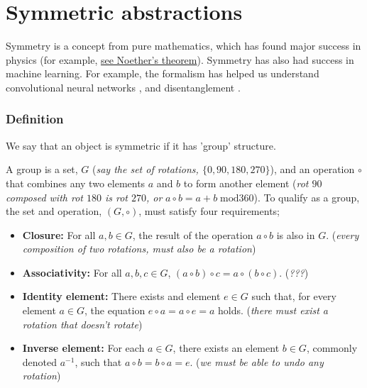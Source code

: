 \newpage
\section{Symmetric abstractions}\label{symmetric-abstractions}

Symmetry is a concept from pure mathematics, which has found major success in physics (for example, \href{https://en.wikipedia.org/wiki/Noether%27s_theorem}{see Noether's theorem}).
Symmetry has also had success in machine learning. For example, the formalism has
helped us understand convolutional neural networks \cite{Cohen2017}, and disentanglement \cite{Higgins2018}.




\subsubsection{Definition}

We say that an object is symmetric if it has 'group' structure.

A group is a set, $G$ (\textit{say the set of rotations, $\{0, 90, 180, 270\}$}),
and an operation $\circ$ that combines any two elements $a$ and $b$ to form
another element (\textit{rot $90$ composed with rot $180$ is rot $270$, or} $a \circ b = a + b \;\text{mod} 360$).
To qualify as a group, the set and operation, $(G, \circ)$, must satisfy four requirements;

\begin{itemize}
	\tightlist
	\item \textbf{Closure:} For all $a, b \in G$, the result of the operation $a \circ b$ is also in $G$. (\textit{every composition of two rotations, must also be a rotation})
	\item \textbf{Associativity:} For all $a,b,c \in G$, $(a\circ b) \circ c = a\circ (b\circ c)$. (\textit{???})
	\item \textbf{Identity element:} There exists and element $e\in G$ such that, for every element $a\in G$, the equation $e\circ a = a\circ e = a$ holds. (\textit{there must exist a rotation that doesn't rotate})
	\item \textbf{Inverse element:} For each $a \in G$, there exists an element $b \in G$, commonly denoted $a^{−1}$, such that $a \circ b = b \circ a = e$. (\textit{we must be able to undo any rotation})
\end{itemize}

